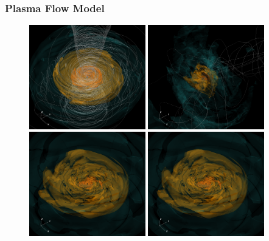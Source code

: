 \subsubsection{Plasma Flow Model}

\begin{figure}
  \centering
  \includegraphics[width=0.45\textwidth]{figures/sane_3D.png}\hspace{1.5pt}%
  \includegraphics[width=0.45\textwidth]{figures/ressler_3D.png}\\
  \includegraphics[width=0.45\textwidth]{figures/mad_3D.png}\hspace{1.5pt}%
  \includegraphics[width=0.45\textwidth]{figures/mad_3D.png}

\end{figure}
